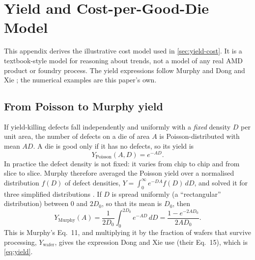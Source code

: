 \section{Yield and Cost-per-Good-Die Model}
\label{app:yield-cost}

This appendix derives the illustrative cost model used in \cref{sec:yield-cost}. It is a textbook-style model for reasoning about trends, not a model of any real AMD product or foundry process. The yield expressions follow Murphy \cite{murphyCostsizeOptimaMonolithic1964} and Dong and Xie \cite{dongSystemlevelCostAnalysis2009}; the numerical examples are this paper's own.

\subsection{From Poisson to Murphy yield}
If yield-killing defects fall independently and uniformly with a \emph{fixed} density $D$ per unit area, the number of defects on a die of area $A$ is Poisson-distributed with mean $AD$. A die is good only if it has no defects, so its yield is
\begin{equation*}
  Y_{\mathrm{Poisson}}(A, D) = e^{-AD}.
\end{equation*}
In practice the defect density is not fixed: it varies from chip to chip and from slice to slice. Murphy therefore averaged the Poisson yield over a normalised distribution $f(D)$ of defect densities, $Y = \int_0^\infty e^{-DA} f(D)\,dD$, and solved it for three simplified distributions \cite[Eqs.~7--11]{murphyCostsizeOptimaMonolithic1964}. If $D$ is spread uniformly (a ``rectangular'' distribution) between $0$ and $2D_0$, so that its mean is $D_0$, then
\begin{equation*}
  Y_{\mathrm{Murphy}}(A) = \frac{1}{2D_0}\int_{0}^{2D_0} e^{-AD}\,dD = \frac{1 - e^{-2AD_0}}{2AD_0}.
\end{equation*}
This is Murphy's Eq.~11, and multiplying it by the fraction of wafers that survive processing, $Y_{\mathrm{wafer}}$, gives the expression Dong and Xie use (their Eq.~15), which is \cref{eq:yield}.

